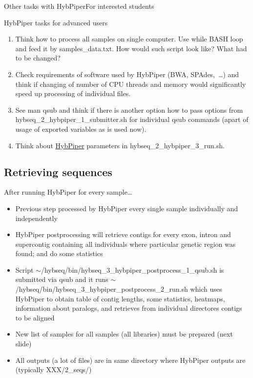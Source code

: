 \documentclass[compress, ucs, xelatex, 11pt, xcolor=x11names, aspectratio=169,
	hyperref={
		bookmarks=true,
		unicode=true,
		colorlinks=true,
		pdftitle={HybSeq course},
		plainpages=false,
		pdfauthor={Vojtech Zeisek},
		pdfsubject={Practical processing of HybSeq target enrichment sequencing data on computing grids like MetaCentrum},
		pdfcreator={XeLaTeX},
		pdfkeywords={BASH, command line, GNU, HybSeq, Linux, MetaCentrum, sequencing shell, target enrichment},
		linkcolor=Turquoise4, %
		anchorcolor=DodgerBlue4, %
		citecolor=DodgerBlue4, %
		filecolor=DodgerBlue4, %
		menucolor=Tan4, %
		urlcolor=DarkOliveGreen4, %
		pdftex},
	url={hyphens, lowtilde} %
	]{beamer}
\renewcommand{\texttt}[1]{\colorbox{Cornsilk2}{{\ttfamily #1}}}
\begin{document}
\begin{frame}{Other tasks with HybPiper}{For interested students}
	\begin{exampleblock}{HybPiper tasks for advanced users}
		\begin{enumerate}
			\item Think how to process all samples on single computer. Use \texttt{while} BASH loop and feed it by \texttt{samples\_data.txt}. How would such script look like? What had to be changed?
			\item Check requirements of software used by HybPiper (BWA, SPAdes,~\ldots) and think if changing of number of CPU threads and memory would significantly speed up processing of individual files.
			\item See \texttt{man qsub} and think if there is another option how to pass options from \texttt{hybseq\_2\_hybpiper\_1\_submitter.sh} for individual \texttt{qsub} commands (apart of usage of exported variables as is used now).
			\item Think about \href{https://github.com/mossmatters/HybPiper/wiki}{HybPiper} parameters in \texttt{hybseq\_2\_hybpiper\_3\_run.sh}.
		\end{enumerate}
	\end{exampleblock}
\end{frame}

\subsection{Retrieving sequences}

\begin{frame}{After running HybPiper for every sample\ldots}
	\begin{itemize}
		\item Previous step processed by HybPiper every single sample individually and independently
		\item HybPiper postprocessing will retrieve contigs for every exon, intron and supercontig containing all individuals where particular genetic region was found; and do some statistics
		\item Script \texttt{$\sim$/hybseq/bin/hybseq\_3\_hybpiper\_postprocess\_1\_qsub.sh} is submitted via \texttt{qsub} and it runs \texttt{$\sim$/hybseq/bin/hybseq\_3\_hybpiper\_postprocess\_2\_run.sh} which uses HybPiper to obtain table of contig lengths, some statistics, heatmaps, information about paralogs, and retrieves from individual directores contigs to be aligned
		\item New list of samples for all samples (all libraries) must be prepared (next slide)
		\item All outputs (a lot of files) are in same directory where HybPiper outputs are (typically \texttt{XXX/2\_seqs/})
	\end{itemize}
\end{frame}
\end{document}
